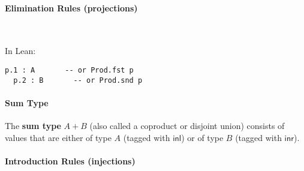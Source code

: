 \paragraph{Elimination Rules (projections)}\mbox{}\\[0.5em]
\noindent
\begin{minipage}[t]{0.48\textwidth}
  \vspace{0pt}
  \begin{prooftree}
  \end{prooftree}
\end{minipage}\hfill
\begin{minipage}[t]{0.48\textwidth}
  \vspace{0pt}
  \begin{prooftree}
  \end{prooftree}
\end{minipage}

\noindent In Lean:
\begin{lstlisting}[language=lean]
  p.1 : A       -- or Prod.fst p
  p.2 : B       -- or Prod.snd p
\end{lstlisting}
\paragraph{Sum Type}
The \textbf{sum type} $A + B$ (also called a coproduct or disjoint union) consists of values that are
either of type $A$ (tagged with $\mathsf{inl}$) or
of type $B$ (tagged with $\mathsf{inr}$).
\paragraph{Introduction Rules (injections)}
\mbox{}\\[0.5em]
\noindent
\begin{minipage}[t]{0.48\textwidth}
  \vspace{0pt}
  \begin{prooftree}
  \end{prooftree}
\end{minipage}\hfill
\begin{minipage}[t]{0.48\textwidth}
  \vspace{0pt}
  \begin{prooftree}
  \end{prooftree}
\end{minipage}

